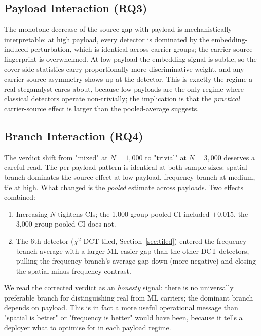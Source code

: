 \documentclass[10pt,twocolumn,a4paper]{article}
\begin{document}
\subsection{Payload Interaction (RQ3)}

The monotone decrease of the source gap with payload is mechanistically interpretable: at high payload, every detector is dominated by the embedding-induced perturbation, which is identical across carrier groups; the carrier-source fingerprint is overwhelmed. At low payload the embedding signal is subtle, so the cover-side statistics carry proportionally more discriminative weight, and any carrier-source asymmetry shows up at the detector. This is exactly the regime a real steganalyst cares about, because low payloads are the only regime where classical detectors operate non-trivially; the implication is that the \emph{practical} carrier-source effect is larger than the pooled-average suggests.

\subsection{Branch Interaction (RQ4)}
\label{sec:rq4discussion}

The verdict shift from "mixed" at $N\!=\!1{,}000$ to "trivial" at $N\!=\!3{,}000$ deserves a careful read. The per-payload pattern is identical at both sample sizes: spatial branch dominates the source effect at low payload, frequency branch at medium, tie at high. What changed is the \emph{pooled} estimate across payloads. Two effects combined:
\begin{enumerate}
\item Increasing $N$ tightens CIs; the 1{,}000-group pooled CI included $+0.015$, the 3{,}000-group pooled CI does not.
\item The 6th detector ($\chi^2$-DCT-tiled, Section~\ref{sec:tiled}) entered the frequency-branch average with a larger ML-easier gap than the other DCT detectors, pulling the frequency branch's average gap down (more negative) and closing the spatial-minus-frequency contrast.
\end{enumerate}
We read the corrected verdict as an \emph{honesty} signal: there is no universally preferable branch for distinguishing real from ML carriers; the dominant branch depends on payload. This is in fact a more useful operational message than "spatial is better" or "frequency is better" would have been, because it tells a deployer what to optimise for in each payload regime.
\end{document}
